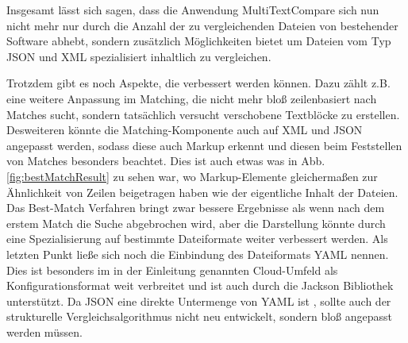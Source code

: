 Insgesamt lässt sich sagen, dass die Anwendung MultiTextCompare sich nun nicht mehr nur durch die Anzahl der zu vergleichenden Dateien von bestehender Software abhebt, sondern zusätzlich Möglichkeiten bietet um Dateien vom Typ JSON und XML spezialisiert inhaltlich zu vergleichen. 

Trotzdem gibt es noch Aspekte, die verbessert werden können. Dazu zählt z.B. eine weitere Anpassung im Matching, die nicht mehr bloß zeilenbasiert nach Matches sucht, sondern tatsächlich versucht verschobene Textblöcke zu erstellen. Desweiteren könnte die Matching-Komponente auch auf XML und JSON angepasst werden, sodass diese auch Markup erkennt und diesen beim Feststellen von Matches besonders beachtet. Dies ist auch etwas was in Abb. \ref{fig:bestMatchResult} zu sehen war, wo Markup-Elemente gleichermaßen zur Ähnlichkeit von Zeilen beigetragen haben wie der eigentliche Inhalt der Dateien. Das Best-Match Verfahren bringt zwar bessere Ergebnisse als wenn nach dem erstem Match die Suche abgebrochen wird, aber die Darstellung könnte durch eine Spezialisierung auf bestimmte Dateiformate weiter verbessert werden. Als letzten Punkt ließe sich noch die Einbindung des Dateiformats YAML nennen. Dies ist besonders im in der Einleitung genannten Cloud-Umfeld als Konfigurationsformat weit verbreitet und ist auch durch die Jackson Bibliothek unterstützt. Da JSON eine direkte Untermenge von YAML ist \cite{yamlSpec}, sollte auch der strukturelle Vergleichsalgorithmus nicht neu entwickelt, sondern bloß angepasst werden müssen.